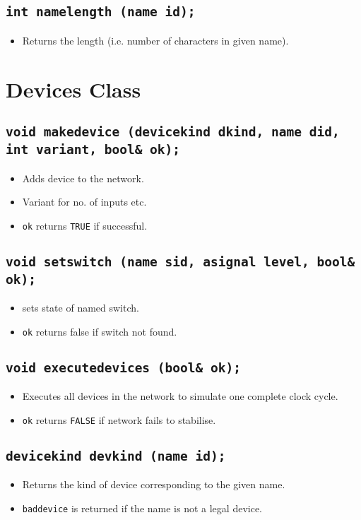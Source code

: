 \documentclass[a4paper,11pt]{article}  %
\begin{document}
\subsection*{\texttt{int namelength (name id);}}
\begin{itemize}
  \item Returns the length (i.e. number of characters in given name).
\end{itemize}

\newpage

\section{Devices Class}

\subsection*{\texttt{void makedevice (devicekind dkind, name did, int
    variant, bool\& ok);}}
\begin{itemize}
  \item Adds device to the network.
  \item Variant for no. of inputs etc.
  \item \texttt{ok} returns \texttt{TRUE} if successful.
\end{itemize}

\subsection*{\texttt{void setswitch (name sid, asignal level, bool\& ok);}}
\begin{itemize}
  \item sets state of named switch.
  \item \texttt{ok} returns false if switch not found.
\end{itemize}

\subsection*{\texttt{void executedevices (bool\& ok);}}
\begin{itemize}
  \item Executes all devices in the network to simulate one complete
    clock cycle. 
  \item \texttt{ok} returns \texttt{FALSE} if network fails to
    stabilise.
\end{itemize}

\subsection*{\texttt{devicekind devkind (name id);}}
\begin{itemize}
  \item Returns the kind of device corresponding to the given name.
  \item \texttt{baddevice} is returned if the name is not a legal device.
\end{itemize}
\end{document}
